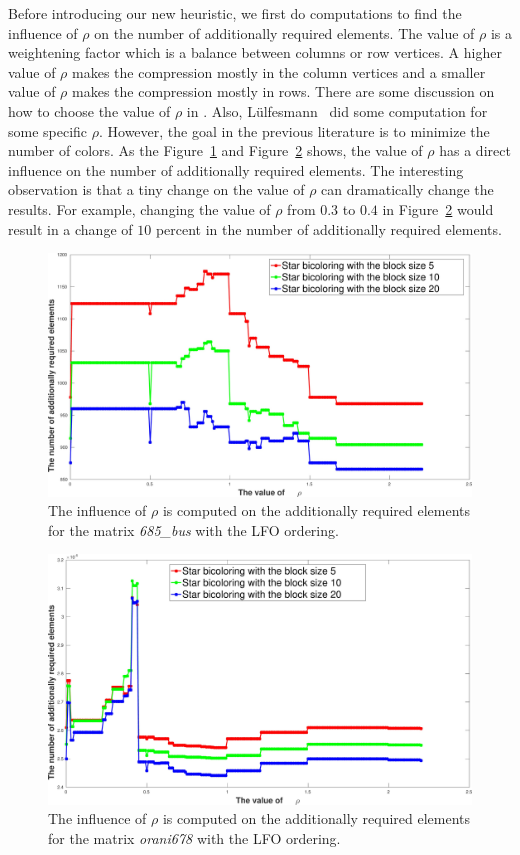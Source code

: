 \documentclass[12pt, twoside,a4paper,toc=bibliography]{scrbook}
\newcommand{\figref}[1]{Figure~\protect\ref{#1}}
\begin{document}
Before introducing our new heuristic, 
we first do computations to find the influence of $\rho$ on the
number of additionally required elements.
The value of $\rho$ is a weightening factor which
is a balance between columns or row vertices. A higher value of $\rho$
makes the compression mostly in the column vertices and
a smaller value of $\rho$ makes the compression mostly in rows.
There are some discussion on how to choose the value of $\rho$ in
\cite{Gebremedhin05whatcolor}. Also,
Lülfesmann~\cite{Lulfesmann2012Fap,LulfesmannMaster} did some computation for some specific $\rho$.
However, the goal in the previous literature is to minimize the number of colors.
As the \figref{rho_value_685_bus} and \figref{rho_value_orani678} shows,
the value of $\rho$ has a direct influence on
the number of additionally required elements.
The interesting observation is that a tiny change
on the value of $\rho$ can dramatically change the
results. For example, changing the value of $\rho$ from
$0.3$ to $0.4$ in \figref{rho_value_orani678} would result
in a change of $10$ percent in the number of additionally required elements.

\begin{figure}
\includegraphics[width=0.9\linewidth]{rho_value_685_bus}
\caption{The influence of $\rho$ is computed on the additionally required elements
for the matrix \textit{685\_bus} with the LFO ordering.}
\label{rho_value_685_bus}
\end{figure}

\begin{figure}
\includegraphics[width=0.9\linewidth]{rho_value_orani678}
\caption{The influence of $\rho$ is computed on the additionally required elements
for the matrix \textit{orani678} with the LFO ordering.}
\label{rho_value_orani678}
\end{figure}
\end{document}
